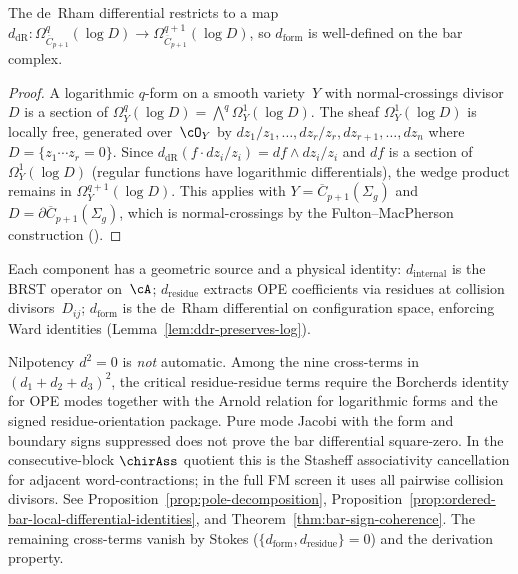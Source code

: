 \begin{lemma}\label{lem:ddr-preserves-log}
The de~Rham differential restricts to a map
$d_{\mathrm{dR}} \colon
 \Omega^q_{\overline{C}_{p+1}}(\log D) \to
 \Omega^{q+1}_{\overline{C}_{p+1}}(\log D)$,
so $d_{\mathrm{form}}$ is well-defined on the bar
complex.
\end{lemma}

\begin{proof}
A logarithmic $q$-form on a smooth variety~$Y$ with
normal-crossings divisor~$D$ is a section of
$\Omega^q_Y(\log D) = \bigwedge^q \Omega^1_Y(\log D)$.
The sheaf $\Omega^1_Y(\log D)$ is locally free,
generated over~$\cO_Y$ by $dz_1/z_1, \ldots, dz_r/z_r,
dz_{r+1}, \ldots, dz_n$ where $D = \{z_1 \cdots z_r = 0\}$.
Since $d_{\mathrm{dR}}(f \cdot dz_i/z_i) = df \wedge
dz_i/z_i$ and $df$ is a section of~$\Omega^1_Y(\log D)$
(regular functions have logarithmic differentials), the
wedge product remains in
$\Omega^{q+1}_Y(\log D)$. This applies with
$Y = \overline{C}_{p+1}(\Sigma_g)$ and
$D = \partial\overline{C}_{p+1}(\Sigma_g)$, which is
normal-crossings by the Fulton--MacPherson construction
(\cite[Theorem~2]{FM94}).
\end{proof}

\begin{remark}\label{rem:three-components}
Each component has a geometric source and a physical identity:
$d_{\text{internal}}$ is the BRST operator on~$\cA$;
$d_{\text{residue}}$ extracts OPE coefficients via residues
at collision divisors~$D_{ij}$;
$d_{\text{form}}$ is the de~Rham differential on configuration space,
enforcing Ward identities
(Lemma~\ref{lem:ddr-preserves-log}).

Nilpotency $d^2 = 0$ is \emph{not} automatic. Among the nine
cross-terms in $(d_1+d_2+d_3)^2$, the critical residue-residue terms
require the Borcherds identity for OPE modes together with the Arnold
relation for logarithmic forms and the signed residue-orientation
package. Pure mode Jacobi with the form and boundary signs suppressed
does not prove the bar differential square-zero. In the
consecutive-block \(\chirAss\) quotient this is the Stasheff
associativity cancellation for adjacent word-contractions; in the full
FM screen it uses all pairwise collision divisors. See
Proposition~\ref{prop:pole-decomposition},
Proposition~\ref{prop:ordered-bar-local-differential-identities}, and
Theorem~\ref{thm:bar-sign-coherence}. The remaining cross-terms vanish
by Stokes ($\{d_{\text{form}},d_{\text{residue}}\}=0$) and the
derivation property.
\end{remark}

